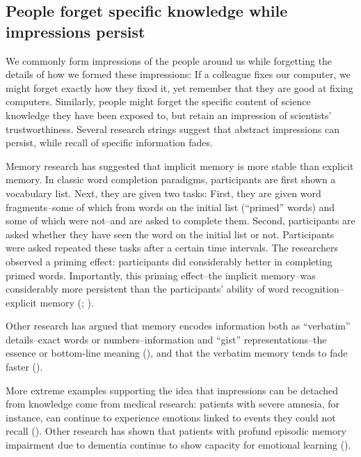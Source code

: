 \documentclass[
  jou,
  floatsintext,
  longtable,
  nolmodern,
  notxfonts,
  notimes,
  colorlinks=true,linkcolor=blue,citecolor=blue,urlcolor=blue]{apa7}
\begin{document}
\subsection{People forget specific knowledge while impressions
persist}\label{people-forget-specific-knowledge-while-impressions-persist}

We commonly form impressions of the people around us while forgetting
the details of how we formed these impressions: If a colleague fixes our
computer, we might forget exactly how they fixed it, yet remember that
they are good at fixing computers. Similarly, people might forget the
specific content of science knowledge they have been exposed to, but
retain an impression of scientists' trustworthiness. Several research
strings suggest that abstract impressions can persist, while recall of
specific information fades.

Memory research has suggested that implicit memory is more stable than
explicit memory. In classic word completion paradigms, participants are
first shown a vocabulary list. Next, they are given two tasks: First,
they are given word fragments--some of which from words on the initial
list (``primed'' words) and some of which were not--and are asked to
complete them. Second, participants are asked whether they have seen the
word on the initial list or not. Participants were asked repeated these
tasks after a certain time intervals. The researchers observed a priming
effect: participants did considerably better in completing primed words.
Importantly, this priming effect--the implicit memory--was considerably
more persistent than the participants' ability of word
recognition--explicit memory
(;
).

Other research has argued that memory encodes information both as
``verbatim'' details--exact words or numbers--information and ``gist''
representations--the essence or bottom-line meaning
(),
and that the verbatim memory tends to fade faster
().

More extreme examples supporting the idea that impressions can be
detached from knowledge come from medical research: patients with severe
amnesia, for instance, can continue to experience emotions linked to
events they could not recall
(). Other research has shown that patients with profund
episodic memory impairment due to dementia continue to show capacity for
emotional learning
().
\end{document}
